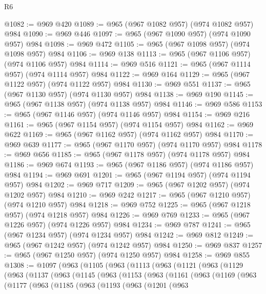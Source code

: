 \begin{lexlean}{R6}
\begin{coremodule}
@1082 := @969 @420
@1089 := @965 (@967 @1082 @957) (@974 @1082 @957) @984
@1090 := @969 @446
@1097 := @965 (@967 @1090 @957) (@974 @1090 @957) @984
@1098 := @969 @472
@1105 := @965 (@967 @1098 @957) (@974 @1098 @957) @984
@1106 := @969 @138
@1113 := @965 (@967 @1106 @957) (@974 @1106 @957) @984
@1114 := @969 @516
@1121 := @965 (@967 @1114 @957) (@974 @1114 @957) @984
@1122 := @969 @164
@1129 := @965 (@967 @1122 @957) (@974 @1122 @957) @984
@1130 := @969 @551
@1137 := @965 (@967 @1130 @957) (@974 @1130 @957) @984
@1138 := @969 @190
@1145 := @965 (@967 @1138 @957) (@974 @1138 @957) @984
@1146 := @969 @586
@1153 := @965 (@967 @1146 @957) (@974 @1146 @957) @984
@1154 := @969 @216
@1161 := @965 (@967 @1154 @957) (@974 @1154 @957) @984
@1162 := @969 @622
@1169 := @965 (@967 @1162 @957) (@974 @1162 @957) @984
@1170 := @969 @639
@1177 := @965 (@967 @1170 @957) (@974 @1170 @957) @984
@1178 := @969 @656
@1185 := @965 (@967 @1178 @957) (@974 @1178 @957) @984
@1186 := @969 @674
@1193 := @965 (@967 @1186 @957) (@974 @1186 @957) @984
@1194 := @969 @691
@1201 := @965 (@967 @1194 @957) (@974 @1194 @957) @984
@1202 := @969 @717
@1209 := @965 (@967 @1202 @957) (@974 @1202 @957) @984
@1210 := @969 @242
@1217 := @965 (@967 @1210 @957) (@974 @1210 @957) @984
@1218 := @969 @752
@1225 := @965 (@967 @1218 @957) (@974 @1218 @957) @984
@1226 := @969 @769
@1233 := @965 (@967 @1226 @957) (@974 @1226 @957) @984
@1234 := @969 @787
@1241 := @965 (@967 @1234 @957) (@974 @1234 @957) @984
@1242 := @969 @812
@1249 := @965 (@967 @1242 @957) (@974 @1242 @957) @984
@1250 := @969 @837
@1257 := @965 (@967 @1250 @957) (@974 @1250 @957) @984
@1258 := @969 @855
@1308 := @1097
    (@963
      (@1105
        (@963
          (@1113
            (@963
              (@1121
                (@963
                  (@1129
                    (@963
                      (@1137
                        (@963
                          (@1145
                            (@963
                              (@1153
                                (@963
                                  (@1161
                                    (@963
                                      (@1169
                                        (@963
                                          (@1177
                                            (@963
                                              (@1185
                                                (@963
                                                  (@1193
                                                    (@963
                                                      (@1201
                                                        (@963

\end{coremodule}
\end{lexlean}
